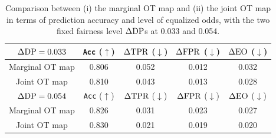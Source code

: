 \documentclass[10pt]{article} %
\begin{document}
\begin{table}
    \footnotesize
    \centering
    \caption{
    Comparison between (i) the marginal OT map and (ii) the joint OT map in terms of prediction accuracy and level of equalized odds, with the two fixed fairness level $\Delta \textup{DP}$s at 0.033 and 0.054.
    }
    \label{table:rFTM-tradeoff}
    \begin{tabular}{c||c|c|c|c}
        \toprule
        $\Delta \textup{DP} = 0.033$ & \texttt{Acc} ($\uparrow$) & $\Delta \textup{TPR}$ ($\downarrow$) & $\Delta \textup{FPR}$ ($\downarrow$) & $\Delta \textup{EO}$ ($\downarrow$)
        \\
        \midrule
        Marginal OT map & 0.806 & 0.052 & 0.012 & 0.032
        \\
        Joint OT map & 0.810 & 0.043 & 0.013 & 0.028
        \\
        \midrule
        $\Delta \textup{DP} = 0.054$ & \texttt{Acc} ($\uparrow$) & $\Delta \textup{TPR}$ ($\downarrow$) & $\Delta \textup{FPR}$ ($\downarrow$) & $\Delta \textup{EO}$ ($\downarrow$)
        \\
        \midrule
        Marginal OT map & 0.826 & 0.031 & 0.023 & 0.027
        \\
        Joint OT map & 0.830 & 0.021 & 0.019 & 0.020
        \\
        \bottomrule
    \end{tabular}
\end{table}
\end{document}
